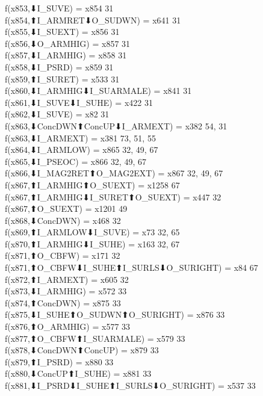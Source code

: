 f(x853,⬇I_SUVE) = x854 {31} \\
f(x854,⬆I_ARMRET⬇O_SUDWN) = x641 {31} \\
f(x855,⬇I_SUEXT) = x856 {31} \\
f(x856,⬇O_ARMHIG) = x857 {31} \\
f(x857,⬇I_ARMHIG) = x858 {31} \\
f(x858,⬇I_PSRD) = x859 {31} \\
f(x859,⬆I_SURET) = x533 {31} \\
f(x860,⬇I_ARMHIG⬇I_SUARMALE) = x841 {31} \\
f(x861,⬇I_SUVE⬇I_SUHE) = x422 {31} \\
f(x862,⬇I_SUVE) = x82 {31} \\
f(x863,⬇ConcDWN⬆ConcUP⬇I_ARMEXT) = x382 {54, 31} \\
f(x863,⬇I_ARMEXT) = x381 {73, 51, 55} \\
f(x864,⬇I_ARMLOW) = x865 {32, 49, 67} \\
f(x865,⬇I_PSEOC) = x866 {32, 49, 67} \\
f(x866,⬇I_MAG2RET⬆O_MAG2EXT) = x867 {32, 49, 67} \\
f(x867,⬆I_ARMHIG⬆O_SUEXT) = x1258 {67} \\
f(x867,⬆I_ARMHIG⬇I_SURET⬆O_SUEXT) = x447 {32} \\
f(x867,⬆O_SUEXT) = x1201 {49} \\
f(x868,⬇ConcDWN) = x468 {32} \\
f(x869,⬆I_ARMLOW⬇I_SUVE) = x73 {32, 65} \\
f(x870,⬆I_ARMHIG⬇I_SUHE) = x163 {32, 67} \\
f(x871,⬆O_CBFW) = x171 {32} \\
f(x871,⬆O_CBFW⬇I_SUHE⬆I_SURLS⬇O_SURIGHT) = x84 {67} \\
f(x872,⬆I_ARMEXT) = x605 {32} \\
f(x873,⬇I_ARMHIG) = x572 {33} \\
f(x874,⬆ConcDWN) = x875 {33} \\
f(x875,⬇I_SUHE⬆O_SUDWN⬆O_SURIGHT) = x876 {33} \\
f(x876,⬆O_ARMHIG) = x577 {33} \\
f(x877,⬆O_CBFW⬆I_SUARMALE) = x579 {33} \\
f(x878,⬇ConcDWN⬆ConcUP) = x879 {33} \\
f(x879,⬆I_PSRD) = x880 {33} \\
f(x880,⬇ConcUP⬆I_SUHE) = x881 {33} \\
f(x881,⬇I_PSRD⬇I_SUHE⬆I_SURLS⬇O_SURIGHT) = x537 {33} \\
